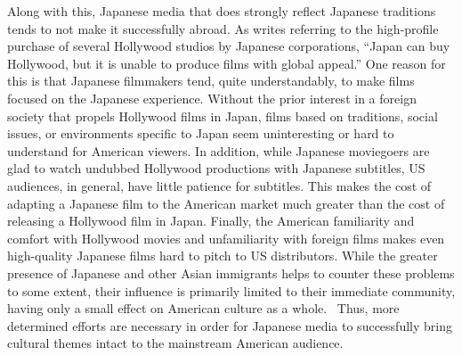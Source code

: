 \documentclass[12pt]{article}
\begin{document}
Along with this, Japanese media that does strongly reflect Japanese traditions tends to not make it successfully abroad.  As \cChing{\citet[pg.\ 171]} writes referring to the high-profile purchase of several Hollywood studios by Japanese corporations, ``Japan can buy Hollywood, but it is unable to produce films with global appeal.''  One reason for this is that Japanese filmmakers tend, quite understandably, to make films focused on the Japanese experience.  Without the prior interest in a foreign society that propels Hollywood films in Japan, films based on traditions, social issues, or environments specific to Japan seem uninteresting or hard to understand for American viewers.  In addition, while Japanese moviegoers are glad to watch undubbed Hollywood productions with Japanese subtitles, US audiences, in general, have little patience for subtitles.  This makes the cost of adapting a Japanese film to the American market much greater than the cost of releasing a Hollywood film in Japan.  Finally, the American familiarity and comfort with Hollywood movies and unfamiliarity with foreign films makes even high-quality Japanese films hard to pitch to US distributors. %
While the greater presence of Japanese and other Asian immigrants helps to counter these problems to some extent, their influence is primarily limited to their immediate community, having only a small effect on American culture as a whole.~\cPark{\citep[pg.\ 277]}
Thus, more determined efforts are necessary in order for Japanese media to successfully bring cultural themes intact to the mainstream American audience.
\end{document}
